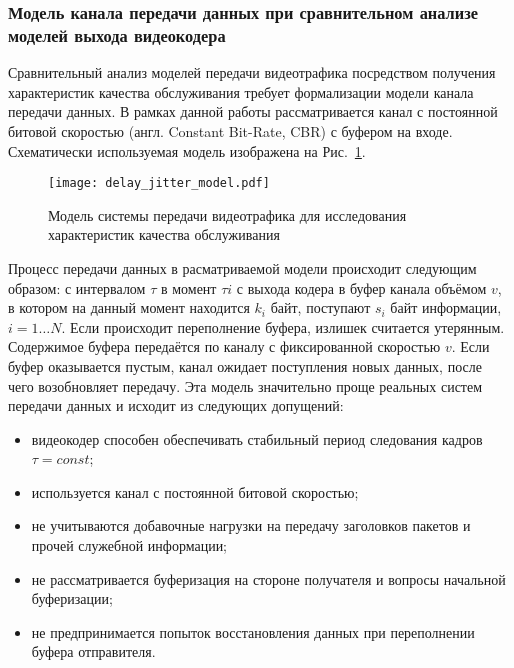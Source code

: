 \subsubsection{Модель канала передачи данных при
сравнительном анализе моделей выхода видеокодера}
\hspace{3pt}

Сравнительный анализ моделей передачи видеотрафика посредством
получения характеристик качества обслуживания требует формализации
модели канала передачи данных. В рамках данной работы
рассматривается канал с постоянной битовой скоростью (англ.
Constant Bit-Rate, CBR) с буфером на входе. Схематически
используемая модель изображена на Рис.~\ref{fig:delay_jitter_model}.

\begin{figure}[h]
    \begin{center}
        \texttt{[image: delay\_jitter\_model.pdf]}
    \end{center}
    \caption{Модель системы передачи видеотрафика для исследования
    характеристик качества обслуживания}
    \label{fig:delay_jitter_model}
\end{figure}

Процесс передачи данных в расматриваемой модели происходит следующим
образом: с интервалом $\tau$ в момент $\tau i$ с выхода
кодера в буфер канала объёмом $v$, в котором на данный момент
находится $k_i$ байт, поступают $s_i$ байт информации, $i = 1 \dots N$.
Если происходит переполнение буфера, излишек считается утерянным.
Содержимое буфера передаётся по каналу с фиксированной скоростью
$v$. Если буфер оказывается пустым, канал ожидает поступления
новых данных, после чего возобновляет передачу.
Эта модель значительно проще реальных систем передачи данных
и исходит из следующих допущений:

\begin{itemize}
    \item видеокодер способен обеспечивать стабильный период следования кадров $\tau = const$;
    \item используется канал с постоянной битовой скоростью;
    \item не учитываются добавочные нагрузки на передачу заголовков пакетов
        и прочей служебной информации;
    \item не рассматривается буферизация на стороне получателя и вопросы начальной буферизации;
    \item не предпринимается попыток восстановления данных при переполнении
        буфера отправителя.
\end{itemize}

